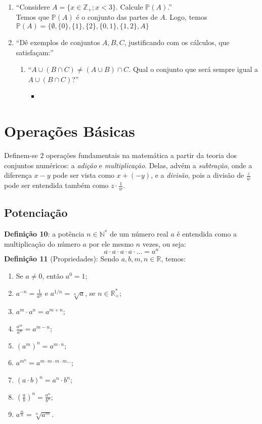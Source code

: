 \documentclass[13pt,letterpaper]{article}
\begin{document}
\begin{enumerate}
\begin{enumerate}
\begin{itemize}
        \end{itemize}
    \end{enumerate}
    \item \enquote{Considere $A = \{ x \in \mathbb{Z}_+ ; x < 3 \}$. Calcule $\mathbb{P}(A)$.} \\
    Temos que $\mathbb{P}(A)$ é o conjunto das partes de $A$. Logo, temos $\mathbb{P}(A) = \{\emptyset, \{0\}, \{1\}, \{2\}, \{0, 1\}, \{1, 2\}, A \}$
    \item \enquote{Dê exemplos de conjuntos $A, B, C$, justificando com os cálculos, que satisfaçam:}
    \begin{enumerate}
        \item \enquote{$A \cup (B \cap C) \ne (A \cup B) \cap C$. Qual o conjunto que será sempre igual a $A \cup (B \cap C)$?}
        \begin{itemize}
            \item 
        \end{itemize}
    \end{enumerate}
\end{enumerate}
\newpage

\section{Operações Básicas}
Definem-se 2 operações fundamentais na matemática a partir da teoria dos conjuntos numéricos: a \emph{adição} e \emph{multiplicação}. Delas, advém a \emph{subtração}, onde a diferença $x - y$ pode ser vista como $x + (-y)$, e a \emph{divisão}, pois a divisão de $\frac{z}{w}$ pode ser entendida também como $z \cdot \frac{1}{w}$.
\subsection{Potenciação}
\textbf{Definição 10}: a potência $n \in \mathbb{N}^*$ de um número real $a$ é entendida como a multiplicação do número $a$ por ele mesmo $n$ vezes, ou seja:
\begin{displaymath}
    a \cdot a \cdot a \cdot a \cdot ... = a^n
\end{displaymath}
\textbf{Definição 11} (Propriedades): Sendo $a, b, m, n \in \mathbb{R}$, temos:
\begin{enumerate}
    \item Se $a \ne 0$, então $a^0 = 1$;
    \item $a^{-n} = \frac{1}{a^n}$ e $a^{1/n} = \sqrt[n]{a}$, se $n \in \mathbb{R}^*_+$;
    \item $a^m \cdot a^n = a^{m+n}$;
    \item $\frac{a^m}{a^n} = a^{m-n}$;
    \item $(a^m)^n = a^{m \cdot n}$;
    \item $a^{m^n} = a^{m \cdot m \cdot m \cdot m ...}$;
    \item $(a \cdot b)^n = a^n \cdot b^n$;
    \item $(\frac{a}{b})^n = \frac{a^n}{b^n}$;
    \item $a^{\frac{m}{n}} = \sqrt[n]{a^m}$.
\end{enumerate}
\end{document}
